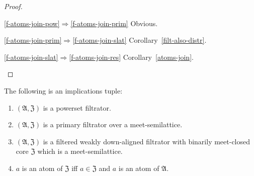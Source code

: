 \begin{proof}
~
\begin{disorder}
\item[\ref{f-atoms-join-pow}$\Rightarrow$\ref{f-atoms-join-prim}] Obvious.
\item[\ref{f-atoms-join-prim}$\Rightarrow$\ref{f-atoms-join-slat}] Corollary~\ref{filt-also-distr}.
\item[\ref{f-atoms-join-slat}$\Rightarrow$\ref{f-atoms-join-res}] Corollary~\ref{atoms-join}.
\end{disorder}
\end{proof}

\begin{thm}
\label{atom-both}The following is an implications tuple:
\begin{enumerate}
\item \label{atom-both-p}$(\mathfrak{A},\mathfrak{Z})$ is a powerset filtrator.
\item \label{atom-both-f}$(\mathfrak{A},\mathfrak{Z})$ is a primary filtrator
over a meet-semilattice.
\item \label{atom-both-mlat}$(\mathfrak{A},\mathfrak{Z})$ is a filtered
weakly down-aligned filtrator with binarily meet-closed core $\mathfrak{Z}$
which is a meet-semilattice.
\item \label{atom-both-conc}$a$ is an atom of $\mathfrak{Z}$ iff $a\in\mathfrak{Z}$
and $a$ is an atom of $\mathfrak{A}$.
\end{enumerate}
\end{thm}
